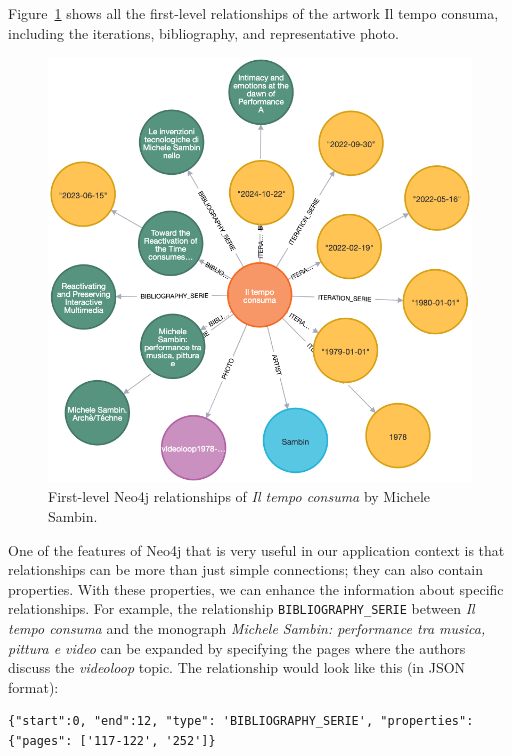 Figure~\ref{fig:c4-neo4j-artworkrelation} shows all the first-level relationships of the artwork Il tempo consuma, including the iterations, bibliography, and representative photo.
\begin{figure}[!h]
    \centering
    \includegraphics[width=1\linewidth]{chapters/4-MDC_model_application/image/neo4j-artworkrelation.png}
    \caption{First-level Neo4j relationships of \textit{Il tempo consuma} by Michele Sambin.}
    \label{fig:c4-neo4j-artworkrelation}
\end{figure}
One of the features of Neo4j that is very useful in our application context is that relationships can be more than just simple connections; they can also contain properties. With these properties, we can enhance the information about specific relationships. For example, the relationship \texttt{BIBLIOGRAPHY\_SERIE} between \textit{Il tempo consuma} and the monograph \textit{Michele Sambin: performance tra musica, pittura e video} \cite{lischi2014michele} can be expanded by specifying the pages where the authors discuss the \textit{videoloop} topic. The relationship would look like this (in JSON format):
\begin{lstlisting}[style=json]
{"start":0, "end":12, "type": 'BIBLIOGRAPHY_SERIE', "properties": {"pages": ['117-122', '252']}
\end{lstlisting}
